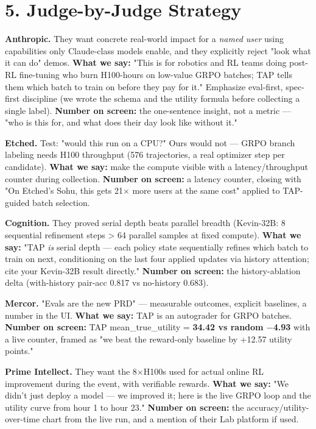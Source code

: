 \documentclass[11pt,letterpaper]{article}
\begin{document}
\medskip

\section*{5. Judge-by-Judge Strategy}

\textbf{Anthropic.} They want concrete real-world impact for a \emph{named user} using capabilities only Claude-class models enable, and they explicitly reject "look what it can do" demos. \textbf{What we say:} "This is for robotics and RL teams doing post-RL fine-tuning who burn H100-hours on low-value GRPO batches; TAP tells them which batch to train on before they pay for it." Emphasize eval-first, spec-first discipline (we wrote the schema and the utility formula before collecting a single label). \textbf{Number on screen:} the one-sentence insight, not a metric --- "who is this for, and what does their day look like without it."

\textbf{Etched.} Test: "would this run on a CPU?" Ours would not --- GRPO branch labeling needs H100 throughput (576 trajectories, a real optimizer step per candidate). \textbf{What we say:} make the compute visible with a latency/throughput counter during collection. \textbf{Number on screen:} a latency counter, closing with "On Etched's Sohu, this gets 21$\times$ more users at the same cost" applied to TAP-guided batch selection.

\textbf{Cognition.} They proved serial depth beats parallel breadth (Kevin-32B: 8 sequential refinement steps > 64 parallel samples at fixed compute). \textbf{What we say:} "TAP \emph{is} serial depth --- each policy state sequentially refines which batch to train on next, conditioning on the last four applied updates via history attention; cite your Kevin-32B result directly." \textbf{Number on screen:} the history-ablation delta (with-history pair-acc 0.817 vs no-history 0.683).

\textbf{Mercor.} "Evals are the new PRD" --- measurable outcomes, explicit baselines, a number in the UI. \textbf{What we say:} TAP is an autograder for GRPO batches. \textbf{Number on screen:} TAP mean\_true\_utility = \textbf{34.42 vs random $-$4.93} with a live counter, framed as "we beat the reward-only baseline by +12.57 utility points."

\textbf{Prime Intellect.} They want the 8$\times$H100s used for actual online RL improvement during the event, with verifiable rewards. \textbf{What we say:} "We didn't just deploy a model --- we improved it; here is the live GRPO loop and the utility curve from hour 1 to hour 23." \textbf{Number on screen:} the accuracy/utility-over-time chart from the live run, and a mention of their Lab platform if used.
\end{document}

